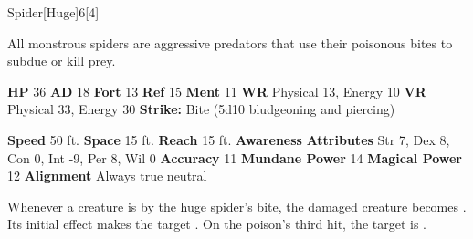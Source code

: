   \begin{monsection}{Spider}[Huge]{6}[4]
    \vspace{-1em}\vspace{-1em}
    \vspace{0em}

    
    All monstrous spiders are aggressive predators that use their poisonous bites to subdue or kill prey.
  
    

    \begin{spellcontent}
      \begin{spelltargetinginfo}
        \pari \textbf{HP} 36 \monsep
          \textbf{AD} 18 \monsep
          \textbf{Fort} 13 \monsep
          \textbf{Ref} 15 \monsep
          \textbf{Ment} 11
        \pari \textbf{WR} Physical 13, Energy 10 \monsep
        \textbf{VR} Physical 33, Energy 30
        \pari \textbf{Strike:}
            Bite  (5d10 bludgeoning and piercing)
      \end{spelltargetinginfo}
    \end{spellcontent}
    \begin{monsterfooter}
      \pari \textbf{Speed} 50 ft. \monsep
        \textbf{Space} 15 ft. \monsep
        \textbf{Reach} 15 ft.
      \pari \textbf{Awareness} 
      \pari \textbf{Attributes}
        Str 7, Dex 8,
        Con 0, Int -9,
        Per 8, Wil 0
      \pari \textbf{Accuracy} 11 \monsep
        \textbf{Mundane Power} 14 \monsep
      \textbf{Magical Power} 12
      \pari \textbf{Alignment} Always true neutral
    \end{monsterfooter}
  \end{monsection}
    Whenever a creature is  by the huge spider's bite,
      the damaged creature becomes .
    Its initial effect makes the target .
    On the poison's third hit, the target is .
  
